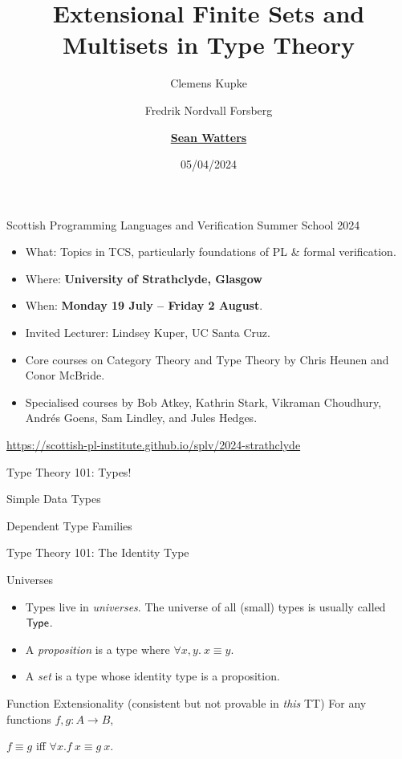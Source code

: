 \documentclass{beamer}
\title[Extenensional Fin. Sets \& Multisets in TT]{Extensional Finite Sets and Multisets in Type Theory}
\author[S. Watters]{Clemens Kupke \and Fredrik Nordvall Forsberg \and \underline{\textbf{Sean Watters}}}
\institute{University of Strathclyde}
\date{05/04/2024}
\begin{document}
\begin{frame}
  \titlepage{}
\end{frame}


\begin{frame}{Scottish Programming Languages and Verification Summer School 2024}
\begin{itemize}
  \item What: Topics in TCS, particularly foundations of PL \& formal verification.
  \item Where: \textbf{University of Strathclyde, Glasgow}
  \item When: \textbf{Monday 19 July -- Friday 2 August}.

  \pause

  \item Invited Lecturer: Lindsey Kuper, UC Santa Cruz.
  \item Core courses on Category Theory and Type Theory by Chris Heunen and Conor McBride.
  \item Specialised courses by Bob Atkey, Kathrin Stark, Vikraman Choudhury, Andr\'{e}s Goens, Sam Lindley, and Jules Hedges.
\end{itemize}

\begin{center}
  \url{https://scottish-pl-institute.github.io/splv/2024-strathclyde}
\end{center}
\end{frame}


\begin{frame}{Type Theory 101: Types!}
  \begin{block}{Simple Data Types}
  \snippetdatalist{}
  \end{block}
\pause
  \begin{block}{Dependent Type Families}
  \snippetmember{}
  \end{block}
\end{frame}

\begin{frame}{Type Theory 101: The Identity Type}
  \snippetidentity{}
  \pause
  \begin{block}{Universes}
    \begin{itemize}
    \item Types live in \emph{universes}. The universe of all (small) types is usually called $\AgdaDatatype{Type}$.
    \pause
    \item A \emph{proposition} is a type where $\forall x,y.~x \equiv y$.
    \pause
    \item A \emph{set} is a type whose identity type is a proposition.
    \end{itemize}
  \end{block}

  \pause
  \begin{block}{Function Extensionality (consistent but not provable in \emph{this} TT)}
    For any functions $f, g : A \to B$,
    \begin{center}
    $f \equiv g$ iff $\forall x. f~x \equiv g~x$.
    \end{center}
  \end{block}
\end{frame}
\end{document}
